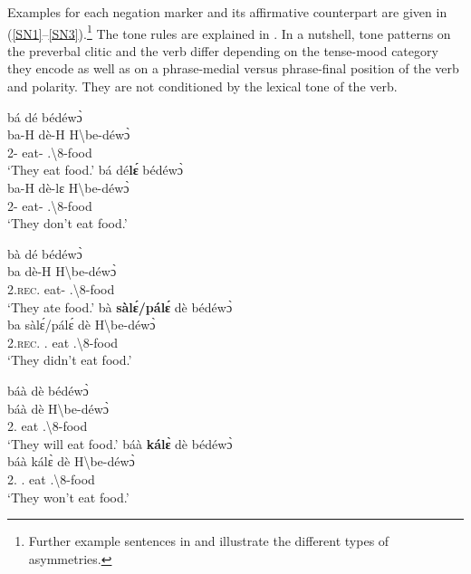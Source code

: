 \documentclass[output=paper,colorlinks=true, citecolor=brown,draftmode]{langscibook}
\begin{document}
Examples for each negation marker and its affirmative counterpart are given in (\ref{SN1}--\ref{SN3}).\footnote{Further example sentences in  and  illustrate the different types of asymmetries.} The tone rules are explained in . In a nutshell, tone patterns on the preverbal clitic and the verb differ depending on the tense-mood category they encode as well as on a phrase-medial versus phrase-final position of the verb and polarity. They are not conditioned by the lexical tone of the verb. 

\ea\label{SN1}
    \ea\label{SN1x}
        \glll bá dé bédéwɔ̀ \\ 
              ba-H dè-H {H\backslash{}be-déwɔ̀} \\
              2-{\PRS} eat-{\R} {{\OBJ}.{\LINK}\backslash{}8-food} \\
        \trans `They eat food.'
    \ex\label{SN2x}
    \glll    bá dé{\bfseries lɛ́} bédéwɔ̀ \\
              ba-H dè-lɛ {H\backslash{}be-déwɔ̀}\\
                 2-{\PRS} eat-{\NEG} {{\OBJ}.{\LINK}\backslash{}8-food} \\
        \trans `They don't eat food.'
    \z
\z

\ea\label{SN2}
    \ea\label{SN2xa}
    \glll    bà dé bédéwɔ̀ \\
              ba dè-H {H\backslash{}be-déwɔ̀}\\
        2.{\textsc{rec.}\PST} eat-{\R} {{\OBJ}.{\LINK}\backslash{}8-food} \\
        \trans `They ate food.'
     \ex\label{SN2xb}
    \glll    bà {\bfseries sàlɛ́/pálɛ́} dè bédéwɔ̀ \\
              ba sàlɛ́/pálɛ́ dè {H\backslash{}be-déwɔ̀}\\
                 2.{\textsc{rec.}\PST} {\NEG}.{\PST} eat {{\OBJ}.{\LINK}\backslash{}8-food}\\
        \trans `They didn't eat food.'
    \z    
\z

\ea\label{SN3}    
    \ea\label{SN3xa}
    \glll    báà dè bédéwɔ̀ \\
              báà dè {H\backslash{}be-déwɔ̀}\\
                 2.{\FUT} eat {{\OBJ}.{\LINK}\backslash{}8-food}\\
        \trans `They will eat food.' 
    \ex\label{SN3xb}
    \glll    báà {\bfseries kálɛ̀} dè bédéwɔ̀ \\
              báà kálɛ̀ dè {H\backslash{}be-déwɔ̀}\\
                 2.{\FUT} {\NEG}.{\FUT} eat {{\OBJ}.{\LINK}\backslash{}8-food}\\
        \trans `They won't eat food.'    
    \z    
\z
\end{document}
